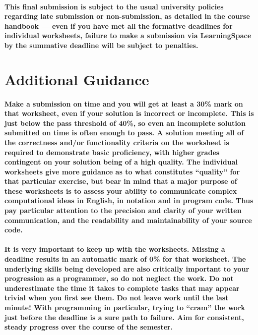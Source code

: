 \documentclass{../../fal_assignment}
\begin{document}
\paragraph{\textbf{This final submission is subject to the usual university policies regarding late submission or non-submission,
as detailed in the course handbook ---
even if you have met all the formative deadlines for individual worksheets,
failure to make a submission via LearningSpace by the summative deadline will be subject to penalties.}}

\section*{Additional Guidance}

\paragraph{Make a submission on time and you will get at least a 30\% mark on that worksheet,
even if your solution is incorrect or incomplete.
This is just below the pass threshold of 40\%, so even an incomplete solution submitted on time is often enough to pass.
A solution meeting all of the correctness and/or functionality criteria on the worksheet is required to demonstrate basic proficiency,
with higher grades contingent on your solution being of a high quality.
The individual worksheets give more guidance as to what constitutes ``quality'' for that particular exercise,
but bear in mind that a major purpose of these worksheets is to assess your ability to communicate
complex computational ideas in English, in notation and in program code.
Thus pay particular attention to the precision and clarity of your written communication,
and the readability and maintainability of your source code.}

\paragraph{It is very important to keep up with the worksheets. Missing a deadline results in an automatic mark of 0\% for that worksheet.
The underlying skills being developed are also critically important to your progression as a programmer, so do not neglect the work.
Do not underestimate the time it takes to complete tasks that may appear trivial when you first see them.
Do not leave work until the last minute! With programming in particular, trying to ``cram'' the work just before the deadline is a sure path to failure. Aim for consistent, steady progress over the course of the semester.}
\end{document}
